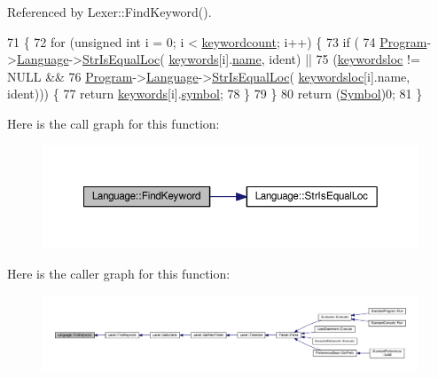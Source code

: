 Referenced by Lexer\+::\+Find\+Keyword().


\begin{DoxyCode}
71 \{
72     \textcolor{keywordflow}{for} (\textcolor{keywordtype}{unsigned} \textcolor{keywordtype}{int} i = 0; i < \hyperlink{classLanguage_ab392fc18ba79a2a47bdde99eec400aa1}{keywordcount}; i++) \{
73         \textcolor{keywordflow}{if} (
74             \hyperlink{classProgram}{Program}->\hyperlink{classProgram_a7c82b4c429bbee984b8bb287b9e137f7}{Language}->\hyperlink{classLanguage_a68d70b8d5232b4fa0b03268531dca0a3}{StrIsEqualLoc}(
      \hyperlink{kword_8h_ae24629a120e041e6b687315832fca587}{keywords}[i].\hyperlink{structkeyworddef_a03b3d7dd316565c6fac8786186ec66c2}{name}, ident) ||
75             (\hyperlink{classLanguage_a14560ed53cf2860b61199d2882c52f67}{keywordsloc} != NULL &&
76              \hyperlink{classProgram}{Program}->\hyperlink{classProgram_a7c82b4c429bbee984b8bb287b9e137f7}{Language}->\hyperlink{classLanguage_a68d70b8d5232b4fa0b03268531dca0a3}{StrIsEqualLoc}(
      \hyperlink{classLanguage_a14560ed53cf2860b61199d2882c52f67}{keywordsloc}[i].name, ident))) \{
77             \textcolor{keywordflow}{return} \hyperlink{kword_8h_ae24629a120e041e6b687315832fca587}{keywords}[i].\hyperlink{structkeyworddef_aec6598e221bbce9e131b30989f7e2cce}{symbol};
78         \}
79     \}
80     \textcolor{keywordflow}{return} (\hyperlink{lex_8h_a7feef761cd73fac6e25b8bb80d2c4e54}{Symbol})0;
81 \}
\end{DoxyCode}


Here is the call graph for this function\+:
\nopagebreak
\begin{figure}[H]
\begin{center}
\leavevmode
\includegraphics[width=350pt]{d0/d41/classLanguage_a8a9aa7fef5a0c2c3626249705292e71a_cgraph}
\end{center}
\end{figure}




Here is the caller graph for this function\+:
\nopagebreak
\begin{figure}[H]
\begin{center}
\leavevmode
\includegraphics[width=350pt]{d0/d41/classLanguage_a8a9aa7fef5a0c2c3626249705292e71a_icgraph}
\end{center}
\end{figure}



